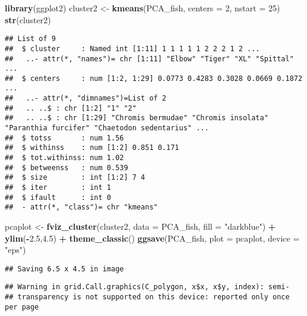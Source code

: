 \documentclass[]{article}
\newenvironment{Shaded}{\begin{snugshade}}{\end{snugshade}}
\newcommand{\KeywordTok}[1]{\textcolor[rgb]{0.13,0.29,0.53}{\textbf{#1}}}
\newcommand{\DataTypeTok}[1]{\textcolor[rgb]{0.13,0.29,0.53}{#1}}
\newcommand{\DecValTok}[1]{\textcolor[rgb]{0.00,0.00,0.81}{#1}}
\newcommand{\FloatTok}[1]{\textcolor[rgb]{0.00,0.00,0.81}{#1}}
\newcommand{\StringTok}[1]{\textcolor[rgb]{0.31,0.60,0.02}{#1}}
\newcommand{\OperatorTok}[1]{\textcolor[rgb]{0.81,0.36,0.00}{\textbf{#1}}}
\newcommand{\NormalTok}[1]{#1}
\begin{document}
\begin{Shaded}
\begin{Highlighting}[]
\KeywordTok{library}\NormalTok{(ggplot2)}
\NormalTok{cluster2 <-}\StringTok{ }\KeywordTok{kmeans}\NormalTok{(PCA_fish, }\DataTypeTok{centers =} \DecValTok{2}\NormalTok{, }\DataTypeTok{nstart =} \DecValTok{25}\NormalTok{)}
\KeywordTok{str}\NormalTok{(cluster2)}
\end{Highlighting}
\end{Shaded}

\begin{verbatim}
## List of 9
##  $ cluster     : Named int [1:11] 1 1 1 1 1 2 2 2 1 2 ...
##   ..- attr(*, "names")= chr [1:11] "Elbow" "Tiger" "XL" "Spittal" ...
##  $ centers     : num [1:2, 1:29] 0.0773 0.4283 0.3028 0.0669 0.1872 ...
##   ..- attr(*, "dimnames")=List of 2
##   .. ..$ : chr [1:2] "1" "2"
##   .. ..$ : chr [1:29] "Chromis bermudae" "Chromis insolata" "Paranthia furcifer" "Chaetodon sedentarius" ...
##  $ totss       : num 1.56
##  $ withinss    : num [1:2] 0.851 0.171
##  $ tot.withinss: num 1.02
##  $ betweenss   : num 0.539
##  $ size        : int [1:2] 7 4
##  $ iter        : int 1
##  $ ifault      : int 0
##  - attr(*, "class")= chr "kmeans"
\end{verbatim}

\begin{Shaded}
\begin{Highlighting}[]
\NormalTok{pcaplot <-}\StringTok{ }\KeywordTok{fviz_cluster}\NormalTok{(cluster2, }\DataTypeTok{data =}\NormalTok{ PCA_fish, }\DataTypeTok{fill =} \StringTok{"darkblue"}\NormalTok{) }\OperatorTok{+}\StringTok{ }\KeywordTok{ylim}\NormalTok{(}\OperatorTok{-}\FloatTok{2.5}\NormalTok{,}\FloatTok{4.5}\NormalTok{) }\OperatorTok{+}\StringTok{ }\KeywordTok{theme_classic}\NormalTok{()}
\KeywordTok{ggsave}\NormalTok{(PCA_fish, }\DataTypeTok{plot =}\NormalTok{ pcaplot, }\DataTypeTok{device =} \StringTok{"eps"}\NormalTok{)}
\end{Highlighting}
\end{Shaded}

\begin{verbatim}
## Saving 6.5 x 4.5 in image
\end{verbatim}

\begin{verbatim}
## Warning in grid.Call.graphics(C_polygon, x$x, x$y, index): semi-
## transparency is not supported on this device: reported only once per page
\end{verbatim}
\end{document}
